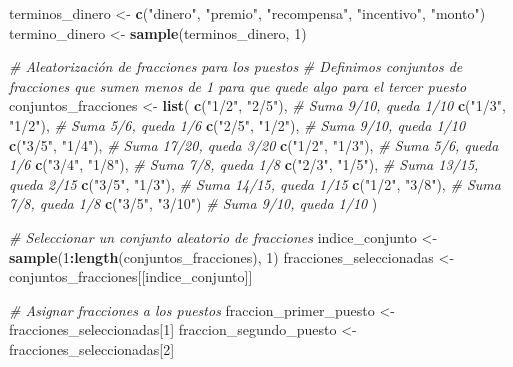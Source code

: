 \documentclass[
]{article}
\newenvironment{Shaded}{\begin{snugshade}}{\end{snugshade}}
\newcommand{\CommentTok}[1]{\textcolor[rgb]{0.56,0.35,0.01}{\textit{#1}}}
\newcommand{\DecValTok}[1]{\textcolor[rgb]{0.00,0.00,0.81}{#1}}
\newcommand{\FunctionTok}[1]{\textcolor[rgb]{0.13,0.29,0.53}{\textbf{#1}}}
\newcommand{\NormalTok}[1]{#1}
\newcommand{\OtherTok}[1]{\textcolor[rgb]{0.56,0.35,0.01}{#1}}
\newcommand{\SpecialCharTok}[1]{\textcolor[rgb]{0.81,0.36,0.00}{\textbf{#1}}}
\newcommand{\StringTok}[1]{\textcolor[rgb]{0.31,0.60,0.02}{#1}}
\begin{document}
\begin{Shaded}
\begin{Highlighting}[]
\NormalTok{terminos\_dinero }\OtherTok{\textless{}{-}} \FunctionTok{c}\NormalTok{(}\StringTok{"dinero"}\NormalTok{, }\StringTok{"premio"}\NormalTok{, }\StringTok{"recompensa"}\NormalTok{, }\StringTok{"incentivo"}\NormalTok{, }\StringTok{"monto"}\NormalTok{)}
\NormalTok{termino\_dinero }\OtherTok{\textless{}{-}} \FunctionTok{sample}\NormalTok{(terminos\_dinero, }\DecValTok{1}\NormalTok{)}

\CommentTok{\# Aleatorización de fracciones para los puestos}
\CommentTok{\# Definimos conjuntos de fracciones que sumen menos de 1 para que quede algo para el tercer puesto}
\NormalTok{conjuntos\_fracciones }\OtherTok{\textless{}{-}} \FunctionTok{list}\NormalTok{(}
  \FunctionTok{c}\NormalTok{(}\StringTok{"1/2"}\NormalTok{, }\StringTok{"2/5"}\NormalTok{),  }\CommentTok{\# Suma 9/10, queda 1/10}
  \FunctionTok{c}\NormalTok{(}\StringTok{"1/3"}\NormalTok{, }\StringTok{"1/2"}\NormalTok{),  }\CommentTok{\# Suma 5/6, queda 1/6}
  \FunctionTok{c}\NormalTok{(}\StringTok{"2/5"}\NormalTok{, }\StringTok{"1/2"}\NormalTok{),  }\CommentTok{\# Suma 9/10, queda 1/10}
  \FunctionTok{c}\NormalTok{(}\StringTok{"3/5"}\NormalTok{, }\StringTok{"1/4"}\NormalTok{),  }\CommentTok{\# Suma 17/20, queda 3/20}
  \FunctionTok{c}\NormalTok{(}\StringTok{"1/2"}\NormalTok{, }\StringTok{"1/3"}\NormalTok{),  }\CommentTok{\# Suma 5/6, queda 1/6}
  \FunctionTok{c}\NormalTok{(}\StringTok{"3/4"}\NormalTok{, }\StringTok{"1/8"}\NormalTok{),  }\CommentTok{\# Suma 7/8, queda 1/8}
  \FunctionTok{c}\NormalTok{(}\StringTok{"2/3"}\NormalTok{, }\StringTok{"1/5"}\NormalTok{),  }\CommentTok{\# Suma 13/15, queda 2/15}
  \FunctionTok{c}\NormalTok{(}\StringTok{"3/5"}\NormalTok{, }\StringTok{"1/3"}\NormalTok{),  }\CommentTok{\# Suma 14/15, queda 1/15}
  \FunctionTok{c}\NormalTok{(}\StringTok{"1/2"}\NormalTok{, }\StringTok{"3/8"}\NormalTok{),  }\CommentTok{\# Suma 7/8, queda 1/8}
  \FunctionTok{c}\NormalTok{(}\StringTok{"3/5"}\NormalTok{, }\StringTok{"3/10"}\NormalTok{)  }\CommentTok{\# Suma 9/10, queda 1/10}
\NormalTok{)}

\CommentTok{\# Seleccionar un conjunto aleatorio de fracciones}
\NormalTok{indice\_conjunto }\OtherTok{\textless{}{-}} \FunctionTok{sample}\NormalTok{(}\DecValTok{1}\SpecialCharTok{:}\FunctionTok{length}\NormalTok{(conjuntos\_fracciones), }\DecValTok{1}\NormalTok{)}
\NormalTok{fracciones\_seleccionadas }\OtherTok{\textless{}{-}}\NormalTok{ conjuntos\_fracciones[[indice\_conjunto]]}

\CommentTok{\# Asignar fracciones a los puestos}
\NormalTok{fraccion\_primer\_puesto }\OtherTok{\textless{}{-}}\NormalTok{ fracciones\_seleccionadas[}\DecValTok{1}\NormalTok{]}
\NormalTok{fraccion\_segundo\_puesto }\OtherTok{\textless{}{-}}\NormalTok{ fracciones\_seleccionadas[}\DecValTok{2}\NormalTok{]}


\end{Highlighting}
\end{Shaded}
\end{document}
